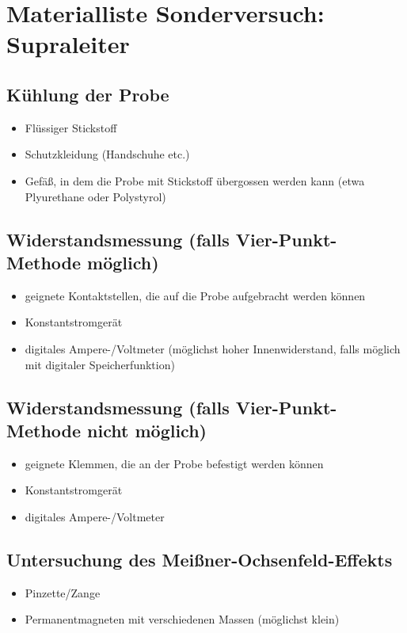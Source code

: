 


\section*{Materialliste Sonderversuch: Supraleiter}
\subsection*{Kühlung der Probe}
\begin{itemize}
  \item Flüssiger Stickstoff
  \item Schutzkleidung (Handschuhe etc.)
  \item Gefäß, in dem die Probe mit Stickstoff übergossen werden kann (etwa Plyurethane oder Polystyrol)
\end{itemize}

\subsection*{Widerstandsmessung (falls Vier-Punkt-Methode möglich)}
\begin{itemize}
  \item geignete Kontaktstellen, die auf die Probe aufgebracht werden können
  \item Konstantstromgerät
  \item digitales Ampere-/Voltmeter (möglichst hoher Innenwiderstand, falls möglich mit digitaler Speicherfunktion)
\end{itemize}

\subsection*{Widerstandsmessung (falls Vier-Punkt-Methode nicht möglich)}
\begin{itemize}
  \item geignete Klemmen, die an der Probe befestigt werden können
  \item Konstantstromgerät
  \item digitales Ampere-/Voltmeter
\end{itemize}

\subsection*{Untersuchung des Meißner-Ochsenfeld-Effekts}
\begin{itemize}
  \item Pinzette/Zange
  \item Permanentmagneten mit verschiedenen Massen (möglichst klein)
\end{itemize}


